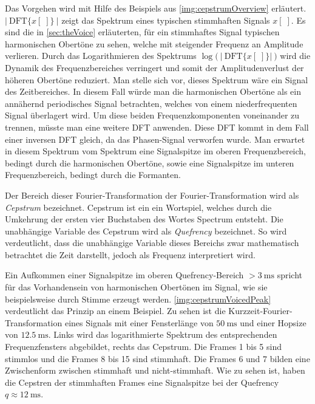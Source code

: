 Das Vorgehen wird mit Hilfe des Beispiels aus \autoref{img:cepstrumOverview} erläutert. $ |\ \text{DFT}\{x[\;]\}\ \big| $  zeigt das Spektrum eines \glqq typischen stimmhaften\grqq{} Signals $x[\;]$. Es sind die in \autoref{sec:theVoice} erläuterten, für ein stimmhaftes Signal typischen harmonischen Obertöne zu sehen, welche mit steigender Frequenz an Amplitude verlieren. Durch das Logarithmieren des Spektrums $\log \big(\ |\ \text{DFT}\{x[\;]\} |\ \big)$ wird die Dynamik des Frequenzbereiches verringert und somit der Amplitudenverlust der höheren Obertöne reduziert. Man stelle sich vor, dieses Spektrum wäre ein Signal des Zeitbereiches. In diesem Fall würde man die harmonischen Obertöne als ein annähernd periodisches Signal betrachten, welches von einem niederfrequenten Signal überlagert wird. Um diese beiden Frequenzkomponenten voneinander zu trennen, müsste man eine weitere DFT anwenden. Diese DFT kommt in dem Fall einer inversen DFT gleich, da das Phasen-Signal verworfen wurde. Man erwartet in diesem \glqq Spektrum vom Spektrum\grqq{} eine Signalspitze im \glqq oberen Frequenzbereich\grqq , bedingt durch die harmonischen Obertöne, sowie eine Signalspitze im \glqq unteren Frequenzbereich\grqq, bedingt durch die Formanten.\cite[\emph{Cepstral analysis}, S. 4]{ricardo_ceps}

Der Bereich dieser \glqq Fourier-Transformation der Fourier-Transformation\grqq{} wird als \emph{Cepstrum} bezeichnet. Cepstrum ist ein ein Wortspiel, welches durch die Umkehrung der ersten vier Buchstaben des Wortes \glqq Spectrum\grqq{} entsteht. Die unabhängige Variable des Cepstrum wird als \emph{Quefrency} bezeichnet. So wird verdeutlicht, dass die unabhängige Variable dieses Bereichs zwar mathematisch betrachtet die Zeit darstellt, jedoch als Frequenz interpretiert wird.\cite[\emph{Cepstral analysis}, S. 7]{ricardo_ceps}	

Ein Aufkommen einer Signalspitze im oberen Quefrency-Bereich $> \SI{3}{\milli\second}$ spricht für das Vorhandensein von harmonischen Obertönen im Signal, wie sie beispielsweise durch Stimme erzeugt werden. \autoref{img:cepstrumVoicedPeak} verdeutlicht das Prinzip an einem Beispiel. Zu sehen ist die Kurzzeit-Fourier-Transformation eines Signals mit einer Fensterlänge von $\SI{50}{\milli\second}$ und einer Hopsize von $\SI{12.5}{\milli\second}$. Links wird das logarithmierte Spektrum des entsprechenden Frequenzfensters abgebildet, rechts das Cepstrum. Die Frames 1 bis 5 sind stimmlos und die Frames 8 bis 15 sind stimmhaft. Die Frames 6 und 7 bilden eine Zwischenform zwischen stimmhaft und nicht-stimmhaft. Wie zu sehen ist, haben die Cepstren der stimmhaften Frames eine Signalspitze bei der Quefrency $q \approx \SI{12}{\milli\second}$.\cite[\emph{Cepstral Analysis}, S. 16]{ricardo_ceps}

